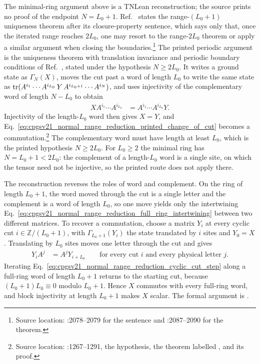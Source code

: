 \documentclass{article}
\begin{document}
The minimal-ring argument above is a TNLean reconstruction; the source
prints no proof of the endpoint $N=L_0+1$. Ref.~\cite{Cirac2021Matrix}
states the range-$(L_0+1)$ uniqueness theorem after its closure-property
sentence, which says only that, once the iterated range reaches $2L_0$, one
may resort to the range-$2L_0$ theorem or apply a similar argument when
closing the boundaries.\footnote{Source location:
:2078--2079 for the sentence and
:2087--2090 for the theorem.} The
printed periodic argument is the uniqueness theorem with translation
invariance and periodic boundary conditions of
Ref.~\cite{PerezGarcia2007Matrix}, stated under the hypothesis $N\geq 2L_0$.
It writes a ground state as $\Gamma_N(X)$, moves the cut past a word of
length $L_0$ to write the same state as
$\operatorname{tr}(A^{i_1}\cdots A^{i_{L_0}}\,Y\,A^{i_{L_0+1}}\cdots A^{i_N})$, and uses
injectivity of the complementary word of length $N-L_0$ to obtain
\begin{align}
    XA^{i_1}\cdots A^{i_{L_0}}
        &= A^{i_1}\cdots A^{i_{L_0}}Y.
    \label{eq:cpgsv21_normal_range_reduction_printed_change_of_cut}
\end{align}
Injectivity of the length-$L_0$ word then gives $X=Y$, and
Eq.~\ref{eq:cpgsv21_normal_range_reduction_printed_change_of_cut} becomes a
commutation.\footnote{Source location:
:1267--1291, the hypothesis,
the theorem labelled , and its proof.} The complementary word
must have length at least $L_0$, which is the printed hypothesis
$N\geq 2L_0$. For $L_0\geq 2$ the minimal ring has $N=L_0+1<2L_0$: the
complement of a length-$L_0$ word is a single site, on which the tensor need
not be injective, so the printed route does not apply there.

The reconstruction reverses the roles of word and complement. On the ring
of length $L_0+1$, the word moved through the cut is a single letter and the
complement is a word of length $L_0$, so one move yields only the
intertwining
Eq.~\ref{eq:cpgsv21_normal_range_reduction_full_ring_intertwining} between
two different matrices. To recover a commutation, choose a matrix $Y_i$ at
every cyclic cut $i\in\mathbb Z/(L_0+1)$, with $\Gamma_{L_0+1}(Y_i)$ the
state translated by $i$ sites and $Y_0=X$. Translating by $L_0$ sites moves
one letter through the cut and gives
\begin{align}
    Y_iA^j
        &= A^jY_{i+L_0}
        \qquad\text{for every cut $i$ and every physical letter $j$}.
    \label{eq:cpgsv21_normal_range_reduction_cyclic_cut_step}
\end{align}
Iterating Eq.~\ref{eq:cpgsv21_normal_range_reduction_cyclic_cut_step} along
a full-ring word of length $L_0+1$ returns to the starting cut, because
$(L_0+1)L_0\equiv 0$ modulo $L_0+1$. Hence $X$ commutes with every full-ring
word, and block injectivity at length $L_0+1$ makes $X$ scalar. The formal
argument is
.
\end{document}

